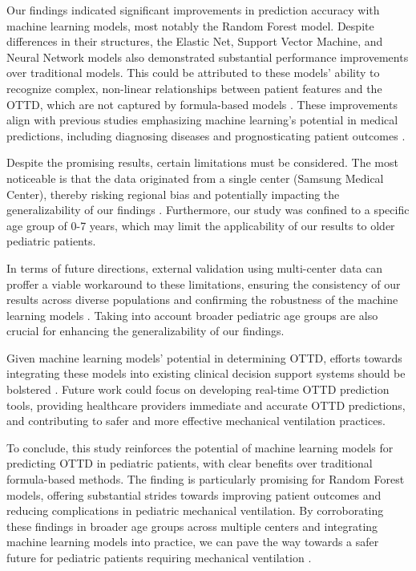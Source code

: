 \documentclass[11pt]{article}
\begin{document}
Our findings indicated significant improvements in prediction accuracy with machine learning models, most notably the Random Forest model. Despite differences in their structures, the Elastic Net, Support Vector Machine, and Neural Network models also demonstrated substantial performance improvements over traditional models. This could be attributed to these models' ability to recognize complex, non-linear relationships between patient features and the OTTD, which are not captured by formula-based models \cite{Fleuren2020MachineLF}. These improvements align with previous studies emphasizing machine learning's potential in medical predictions, including diagnosing diseases and prognosticating patient outcomes \cite{Khera2021UseOM, Roberts2020CommonPA}.

Despite the promising results, certain limitations must be considered. The most noticeable is that the data originated from a single center (Samsung Medical Center), thereby risking regional bias and potentially impacting the generalizability of our findings \cite{Ng2020PredictingTS}. Furthermore, our study was confined to a specific age group of 0-7 years, which may limit the applicability of our results to older pediatric patients. 

In terms of future directions, external validation using multi-center data can proffer a viable workaround to these limitations, ensuring the consistency of our results across diverse populations and confirming the robustness of the machine learning models \cite{Tsai2020TransferLW}. Taking into account broader pediatric age groups are also crucial for enhancing the generalizability of our findings.

Given machine learning models' potential in determining OTTD, efforts towards integrating these models into existing clinical decision support systems should be bolstered \cite{Vellido2019TheIO}. Future work could focus on developing real-time OTTD prediction tools, providing healthcare providers immediate and accurate OTTD predictions, and contributing to safer and more effective mechanical ventilation practices.

To conclude, this study reinforces the potential of machine learning models for predicting OTTD in pediatric patients, with clear benefits over traditional formula-based methods. The finding is particularly promising for Random Forest models, offering substantial strides towards improving patient outcomes and reducing complications in pediatric mechanical ventilation. By corroborating these findings in broader age groups across multiple centers and integrating machine learning models into practice, we can pave the way towards a safer future for pediatric patients requiring mechanical ventilation \cite{Ng2020PredictingTS}.
\end{document}
